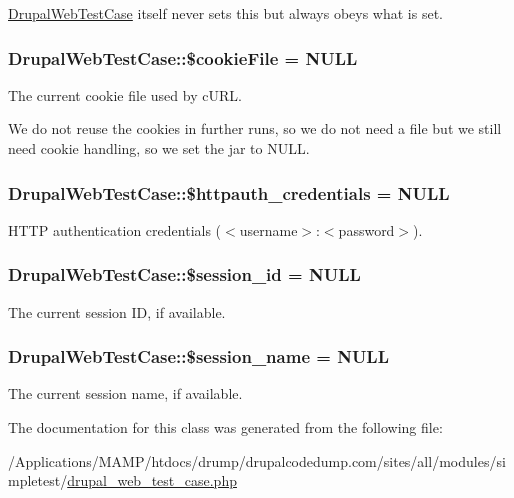 \hyperlink{class_drupal_web_test_case}{DrupalWebTestCase} itself never sets this but always obeys what is set. \hypertarget{class_drupal_web_test_case_abee07354ff94d9b036c7b2e1b1855176}{
\subsubsection[{\$cookieFile}]{\setlength{\rightskip}{0pt plus 5cm}DrupalWebTestCase::\$cookieFile = NULL}}
\label{class_drupal_web_test_case_abee07354ff94d9b036c7b2e1b1855176}
The current cookie file used by cURL.

We do not reuse the cookies in further runs, so we do not need a file but we still need cookie handling, so we set the jar to NULL. \hypertarget{class_drupal_web_test_case_a1d8ed55611dfba216fc9a7eaaca59b8d}{
\subsubsection[{\$httpauth\_\-credentials}]{\setlength{\rightskip}{0pt plus 5cm}DrupalWebTestCase::\$httpauth\_\-credentials = NULL}}
\label{class_drupal_web_test_case_a1d8ed55611dfba216fc9a7eaaca59b8d}
HTTP authentication credentials ($<$username$>$:$<$password$>$). \hypertarget{class_drupal_web_test_case_a2f8ec9f9c31df56f5502f473e7b78e31}{
\subsubsection[{\$session\_\-id}]{\setlength{\rightskip}{0pt plus 5cm}DrupalWebTestCase::\$session\_\-id = NULL}}
\label{class_drupal_web_test_case_a2f8ec9f9c31df56f5502f473e7b78e31}
The current session ID, if available. \hypertarget{class_drupal_web_test_case_acb07ddaedaef0c5d08610666ec74cb45}{
\subsubsection[{\$session\_\-name}]{\setlength{\rightskip}{0pt plus 5cm}DrupalWebTestCase::\$session\_\-name = NULL}}
\label{class_drupal_web_test_case_acb07ddaedaef0c5d08610666ec74cb45}
The current session name, if available. 

The documentation for this class was generated from the following file:\begin{DoxyCompactItemize}
\item 
/Applications/MAMP/htdocs/drump/drupalcodedump.com/sites/all/modules/simpletest/\hyperlink{drupal__web__test__case_8php}{drupal\_\-web\_\-test\_\-case.php}\end{DoxyCompactItemize}
